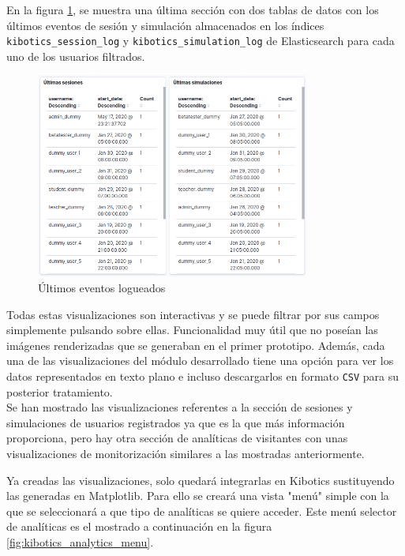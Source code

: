 \documentclass[11pt,a4paper]{book}
\begin{document}
				En la figura \ref{fig:kibana_latestevent}, se muestra una última sección con dos tablas de datos con los últimos eventos de sesión y simulación almacenados en los índices \texttt{kibotics\_session\_log} y \texttt{kibotics\_simulation\_log} de Elasticsearch para cada uno de los usuarios filtrados. 
				\begin{figure}[H]
					\centering
					\includegraphics[width=9cm, keepaspectratio]{img/kibana_08_latest_event}
					\caption{Últimos eventos logueados}
					\label{fig:kibana_latestevent}
				\end{figure}

				
				Todas estas visualizaciones son interactivas y se puede filtrar por sus campos simplemente pulsando sobre ellas. Funcionalidad muy útil que no poseían las imágenes renderizadas que se generaban en el primer prototipo. Además, cada una de las visualizaciones del módulo desarrollado tiene una opción para ver los datos representados en texto plano e incluso descargarlos en formato \texttt{CSV} para su posterior tratamiento.\\
					
				Se han mostrado las visualizaciones referentes a la sección de sesiones y simulaciones de usuarios registrados ya que es la que más información proporciona, pero hay otra sección de analíticas de visitantes con unas visualizaciones de monitorización similares a las mostradas anteriormente.
				
				Ya creadas las visualizaciones, solo quedará integrarlas en Kibotics sustituyendo las generadas en Matplotlib. Para ello se creará una vista "menú" simple con la que se seleccionará a que tipo de analíticas se quiere acceder. Este menú selector de analíticas es el mostrado a continuación en la figura \ref{fig:kibotics_analytics_menu}.
\end{document}
